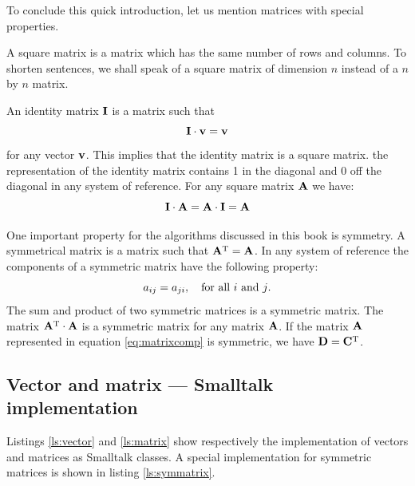 \documentclass[twoside]{book}
\begin{document}
To conclude this quick introduction, let us mention matrices with
special properties.

A square matrix is a matrix which has the same number of rows and
columns. To shorten sentences, we shall speak of a square matrix
of dimension $n$ instead of a $n$ by $n$ matrix.

An identity matrix ${\bf I}$ is a matrix such that
\begin{equation}
  {\bf I}\cdot{\bf v}={\bf v}
\end{equation}
for any vector ${\bf v}$. This implies that the identity matrix is
a square matrix. the representation of the identity matrix
contains 1 in the diagonal and 0 off the diagonal in any system of
reference. For any square matrix ${\bf A}$ we have:
\begin{equation}
  {\bf I}\cdot{\bf A}={\bf A}\cdot{\bf I}={\bf A}
\end{equation}

One important property for the algorithms discussed in this book
is symmetry. A symmetrical matrix is a matrix such that ${\bf
A}^{\mathop{\rm T}}={\bf A}$. In any system of reference the
components of a symmetric matrix have the following property:
\begin{equation}
  a_{ij}=a_{ji}, \mbox{\quad for all $i$ and $j$.}
\end{equation}
The sum and product of two symmetric matrices is a symmetric
matrix. The matrix ${\bf A}^{\mathop{\rm T}}\cdot{\bf A}$ is a
symmetric matrix for any matrix ${\bf A}$. If the matrix ${\bf A}$
represented in equation \ref{eq:matrixcomp} is symmetric, we have
${\bf D}={\bf C}^{\mathop{\rm T}}$.

\subsection{Vector and matrix --- Smalltalk  implementation}
\label{sec:slinearalgebra}  Listings \ref{ls:vector} and \ref{ls:matrix} show
respectively the implementation of vectors and matrices as
Smalltalk classes. A special implementation for symmetric matrices
is shown in listing \ref{ls:symmatrix}.
\end{document}
